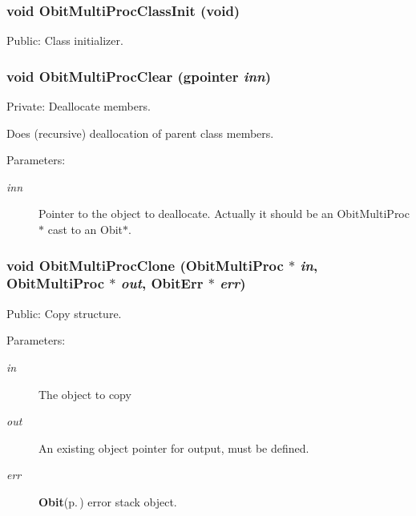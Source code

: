 \subsubsection{\setlength{\rightskip}{0pt plus 5cm}void Obit\-Multi\-Proc\-Class\-Init (void)}\label{ObitMultiProc_8c_a22}


Public: Class initializer. 

\subsubsection{\setlength{\rightskip}{0pt plus 5cm}void Obit\-Multi\-Proc\-Clear (gpointer {\em inn})}\label{ObitMultiProc_8c_a4}


Private: Deallocate members. 

Does (recursive) deallocation of parent class members. \begin{Desc}
\item[Parameters:]
\begin{description}
\item[{\em inn}]Pointer to the object to deallocate. Actually it should be an Obit\-Multi\-Proc$\ast$ cast to an Obit$\ast$. \end{description}
\end{Desc}
\subsubsection{\setlength{\rightskip}{0pt plus 5cm}void Obit\-Multi\-Proc\-Clone ({\bf Obit\-Multi\-Proc} $\ast$ {\em in}, {\bf Obit\-Multi\-Proc} $\ast$ {\em out}, {\bf Obit\-Err} $\ast$ {\em err})}\label{ObitMultiProc_8c_a14}


Public: Copy structure. 

\begin{Desc}
\item[Parameters:]
\begin{description}
\item[{\em in}]The object to copy \item[{\em out}]An existing object pointer for output, must be defined. \item[{\em err}]{\bf Obit}{\rm (p.\,\pageref{structObit})} error stack object. \end{description}
\end{Desc}
